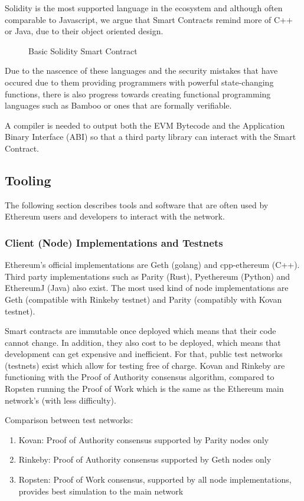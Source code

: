 Solidity is the most supported language in the ecosystem and although often comparable to Javascript, we argue that Smart Contracts remind more of C++ or Java, due to their object oriented design. 

\begin{figure}[ht]
    \centering
    
    \caption{Basic Solidity Smart Contract}
    \label{smart_contract}
\end{figure}

Due to the nascence of these languages and the security mistakes that have occured due to them providing programmers with powerful state-changing functions, there is also progress towards creating functional programming languages such as Bamboo or ones that are formally verifiable.

A compiler is needed to output both the EVM Bytecode and the Application Binary Interface (ABI) so that a third party library can interact with the Smart Contract.


\subsection{Tooling}
The following section describes tools and software that are often used by Ethereum users and developers to interact with the network.
\subsubsection{Client (Node) Implementations and Testnets}
Ethereum's official implementations are Geth (golang) and cpp-ethereum (C++). Third party implementations such as Parity (Rust), Pyethereum (Python) and EthereumJ (Java) also exist. The most used kind of node implementations are Geth (compatible with Rinkeby testnet) and Parity (compatibly with Kovan testnet). 

Smart contracts are immutable once deployed which means that their code cannot change. In addition, they also cost to be deployed, which means that development can get expensive and inefficient. For that, public test networks (testnets) exist which allow for testing free of charge. Kovan and Rinkeby are functioning with the Proof of Authority \cite{poa} consensus algorithm, compared to Ropsten running the Proof of Work \cite{ethash} which is the same as the Ethereum main network's (with less difficulty). 

Comparison between test networks:
\begin{enumerate}
    \item Kovan: Proof of Authority consensus supported by Parity nodes only
    \item Rinkeby: Proof of Authority consensus supported by Geth nodes only
    \item Ropsten: Proof of Work consensus, supported by all node implementations, provides best simulation to the main network 
\end{enumerate}

